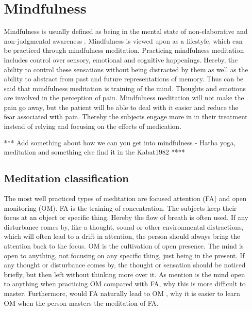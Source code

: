 \section{Mindfulness}
Mindfulness is usually defined as being in the mental state of non-elaborative and non-judgmental awareness \cite{Zeidan2012,Zeidan2016,Tang2017}. Mindfulness is viewed upon as a lifestyle, which can be practiced through mindfulness meditation. Practicing mindfulness meditation includes control over sensory, emotional and cognitive happenings. Hereby, the ability to control these sensations without being distracted by them as well as the ability to abstract from past and future representations of memory. Thus can be said that mindfulness meditation is training of the mind. \cite{Tang2017}
Thoughts and emotions are involved in the perception of pain.
Mindfulness meditation will not make the pain go away, but the patient will be able to deal with it easier and reduce the fear associated with pain. Thereby the subjects engage more in in their treatment instead of relying and focusing on the effects of medication. \cite{Jacob2016}

*** Add something about how we can you get into mindfulness - Hatha yoga, meditation and something else find it in the Kabat1982 ****

\subsection{Meditation classification}
The most well practiced types of meditation are focused attention (FA) and open monitoring (OM).\cite{Zeidan2016} FA is the training of concentration. The subjects keep their focus at an object or specific thing. Hereby the flow of breath is often used.  If any disturbance comes by, like a thought, sound or other environmental distractions, which will often lead to a drift in attention, the person should always bring the attention back to the focus. \cite{Zeidan2016} OM is the cultivation of open presence. The mind is open to anything, not focusing on any specific thing, just being in the present. If any thought or disturbance comes by, the thought or sensation should be noticed briefly, but then left without thinking more over it. As mention is the mind open to anything when practicing OM compared with FA, why this is more difficult to master. Furthermore, would FA naturally lead to OM \citep{Perlman2016}, why it is easier to learn OM when the person masters the meditation of FA.\cite{Zeidan2016}



